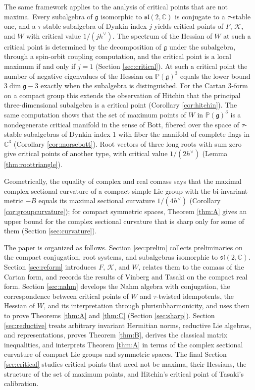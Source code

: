 \documentclass[leqno,10pt]{amsart}
\theoremstyle{definition}
\numberwithin{equation}{section}
\newcommand{\sect}{\mathscr{K}}
\newcommand{\sll}{\mathfrak{sl}}
\newcommand{\proj}{\mathbb{P}}
\newcommand{\g}{\mathfrak{g}}
\newcommand{\com}{\mathbb C}
\newcommand{\hv}{h^\vee}
\begin{document}
The same framework applies to the analysis of critical points that are not maxima. Every subalgebra of $\g$ isomorphic to $\sll(2, \com)$ is conjugate to a $\tau$-stable one, and a $\tau$-stable subalgebra of Dynkin index $j$ yields critical points of $F$, $\sect$, and $W$ with critical value $1/(j\hv)$. The spectrum of the Hessian of $W$ at such a critical point is determined by the decomposition of $\g$ under the subalgebra, through a spin-orbit coupling computation, and the critical point is a local maximum if and only if $j = 1$ (Section \ref{sec:critical}). At such a critical point the number of negative eigenvalues of the Hessian on $\proj(\g)^{3}$ equals the lower bound $3\dim\g - 3$ exactly when the subalgebra is distinguished. For the Cartan $3$-form on a compact group this extends the observation of Hitchin \cite{Hitchin-calibrations} that the principal three-dimensional subalgebra is a critical point (Corollary \ref{cor:hitchin}). The same computation shows that the set of maximum points of $W$ in $\proj(\g)^{3}$ is a nondegenerate critical manifold in the sense of Bott, fibered over the space of $\tau$-stable subalgebras of Dynkin index $1$ with fiber the manifold of complete flags in $\com^{3}$ (Corollary \ref{cor:morsebott}). Root vectors of three long roots with sum zero give critical points of another type, with critical value $1/(2\hv)$ (Lemma \ref{thm:roottriangle}).

Geometrically, the equality of complex and real comass says that the maximal complex sectional curvature of a compact simple Lie group with the bi-invariant metric $-B$ equals its maximal sectional curvature $1/(4\hv)$ (Corollary \ref{cor:groupcurvature}); for compact symmetric spaces, Theorem \ref{thm:A} gives an upper bound for the complex sectional curvature that is sharp only for some of them (Section \ref{sec:curvature}).

The paper is organized as follows. Section \ref{sec:prelim} collects preliminaries on the compact conjugation, root systems, and subalgebras isomorphic to $\sll(2, \com)$. Section \ref{sec:reform} introduces $F$, $\sect$, and $W$, relates them to the comass of the Cartan form, and records the results of Vinberg and Tasaki on the compact real form. Section \ref{sec:nahm} develops the Nahm algebra with conjugation, the correspondence between critical points of $W$ and $\tau$-twisted idempotents, the Hessian of $W$, and its interpretation through plurisubharmonicity, and uses them to prove Theorems \ref{thm:A} and \ref{thm:C} (Section \ref{sec:sharp}). Section \ref{sec:reductive} treats arbitrary invariant Hermitian norms, reductive Lie algebras, and representations, proves Theorem \ref{thm:B}, derives the classical matrix inequalities, and interprets Theorem \ref{thm:A} in terms of the complex sectional curvature of compact Lie groups and symmetric spaces. The final Section \ref{sec:critical} studies critical points that need not be maxima, their Hessians, the structure of the set of maximum points, and Hitchin's critical point of Tasaki's calibration.
\end{document}
